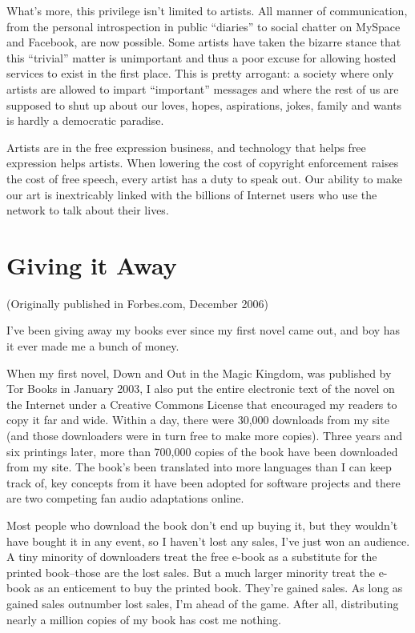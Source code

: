 What's more, this privilege isn't limited to artists. All manner of
communication, from the personal introspection in public ``diaries''
to social chatter on MySpace and Facebook, are now possible. Some
artists have taken the bizarre stance that this ``trivial'' matter is
unimportant and thus a poor excuse for allowing hosted services to
exist in the first place. This is pretty arrogant: a society where
only artists are allowed to impart ``important'' messages and where
the rest of us are supposed to shut up about our loves, hopes,
aspirations, jokes, family and wants is hardly a democratic
paradise.

Artists are in the free expression business, and technology that
helps free expression helps artists. When lowering the cost of
copyright enforcement raises the cost of free speech, every artist
has a duty to speak out. Our ability to make our art is
inextricably linked with the billions of Internet users who use the
network to talk about their lives.

\section{Giving it Away}

(Originally published in Forbes.com, December 2006)

I've been giving away my books ever since my first novel came out,
and boy has it ever made me a bunch of money.

When my first novel, Down and Out in the Magic Kingdom, was
published by Tor Books in January 2003, I also put the entire
electronic text of the novel on the Internet under a Creative
Commons License that encouraged my readers to copy it far and wide.
Within a day, there were 30,000 downloads from my site (and those
downloaders were in turn free to make more copies). Three years and
six printings later, more than 700,000 copies of the book have been
downloaded from my site. The book's been translated into more
languages than I can keep track of, key concepts from it have been
adopted for software projects and there are two competing fan audio
adaptations online.

Most people who download the book don't end up buying it, but they
wouldn't have bought it in any event, so I haven't lost any sales,
I've just won an audience. A tiny minority of downloaders treat the
free e-book as a substitute for the printed book--those are the
lost sales. But a much larger minority treat the e-book as an
enticement to buy the printed book. They're gained sales. As long
as gained sales outnumber lost sales, I'm ahead of the game. After
all, distributing nearly a million copies of my book has cost me
nothing.

